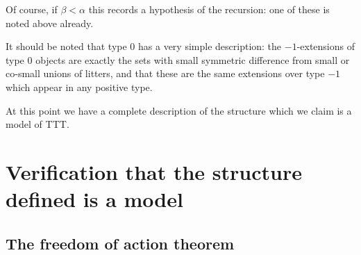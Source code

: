 \documentclass[112pt]{article}
\begin{document}
\begin{description}
Of course, if $\beta<\alpha$ this records a hypothesis of the recursion:  one of these is noted above already.


   It should be noted that type 0 has a very simple description:  the $-1$-extensions of type 0 objects are exactly the sets with small symmetric difference from small or co-small unions of litters, and that these are the same extensions over type $-1$ which appear in any positive type.




\begin{comment}

NOTE TO SELF:  write out the back and forth argument in more detail for communication with Sky

\end{comment}


At this point we have a complete description of the structure which we claim is a model of TTT.


\end{description}

\section{Verification that the structure defined is a model}

\subsection{The freedom of action theorem}
\end{document}
